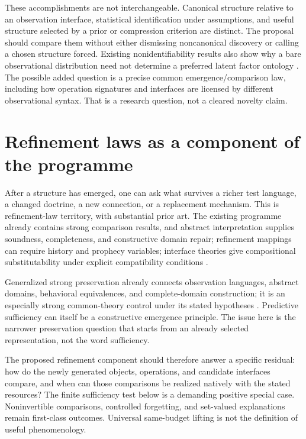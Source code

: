 \documentclass[11pt]{article}
\theoremstyle{remark}
\begin{document}
These accomplishments are not interchangeable. Canonical structure relative to an observation interface, statistical identification under assumptions, and useful structure selected by a prior or compression criterion are distinct. The proposal should compare them without either dismissing noncanonical discovery or calling a chosen structure forced. Existing nonidentifiability results also show why a bare observational distribution need not determine a preferred latent factor ontology \cite{Disentanglement}. The possible added question is a precise common emergence/comparison law, including how operation signatures and interfaces are licensed by different observational syntax. That is a research question, not a cleared novelty claim.

\section{Refinement laws as a component of the programme}
\label{sec:refinement-component}

After a structure has emerged, one can ask what survives a richer test language, a changed doctrine, a new connection, or a replacement mechanism. This is refinement-law territory, with substantial prior art. The existing programme already contains strong comparison results, and abstract interpretation supplies soundness, completeness, and constructive domain repair; refinement mappings can require history and prophecy variables; interface theories give compositional substitutability under explicit compatibility conditions \cite{AbstractCompletion,RefinementMappings,InterfaceAutomata}.

Generalized strong preservation already connects observation languages, abstract domains, behavioral equivalences, and complete-domain construction; it is an especially strong common-theory control under its stated hypotheses \cite{StrongPreservation}. Predictive sufficiency can itself be a constructive emergence principle. The issue here is the narrower preservation question that starts from an already selected representation, not the word sufficiency.

The proposed refinement component should therefore answer a specific residual: how do the newly generated objects, operations, and candidate interfaces compare, and when can those comparisons be realized natively with the stated resources? The finite sufficiency test below is a demanding positive special case. Noninvertible comparisons, controlled forgetting, and set-valued explanations remain first-class outcomes. Universal same-budget lifting is not the definition of useful phenomenology.
\end{document}
